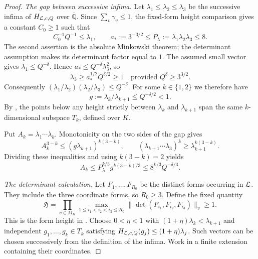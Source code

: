 \documentclass[11pt]{article}
\numberwithin{equation}{section}
\theoremstyle{remark}\newtheorem{remark}[theorem]{Remark}
\newcommand{\Qbar}{\overline{\mathbb Q}}
\begin{document}
\begin{proof}
\emph{The gap between successive infima.}
Let $\lambda_1\le\lambda_2\le\lambda_3$ be the successive infima of
$H_{\mathcal L,c,Q}$ over $\Qbar$. Since $\sum_v\gamma_v\le1$, the fixed-form
height comparison gives a constant $C_0\ge1$ such that
\begin{equation}\label{eq:minima}
 C_0^{-1}Q^{-1}\le\lambda_1,\qquad
 a_*:=3^{-3/2}\le P_\lambda:=\lambda_1\lambda_2\lambda_3\le8.
\end{equation}
The second assertion is the absolute Minkowski theorem; the determinant
assumption makes its determinant factor equal to $1$.
The assumed small vector gives $\lambda_1\le Q^{-\delta}$. Hence
$a_*\le Q^{-\delta}\lambda_3^2$, so
\[
 \lambda_3\ge a_*^{1/2}Q^{\delta/2}\ge1
 \quad\text{provided }Q^\delta\ge3^{3/2}.
\]
Consequently
$(\lambda_1/\lambda_2)(\lambda_2/\lambda_3)\le Q^{-\delta}$.
For some $k\in\{1,2\}$ we therefore have
\begin{equation}\label{eq:minimagap}
 g:=\lambda_k/\lambda_{k+1}\le Q^{-\delta/2}<1.
\end{equation}
By \cite[Lemma~9.1]{EF13}, the points below any height strictly between
$\lambda_k$ and $\lambda_{k+1}$ span the same $k$-dimensional subspace
$T_k$, defined over $K$.

Put $A_k=\lambda_1\cdots\lambda_k$. Monotonicity on the two sides of
the gap gives
\[
 A_k^{3-k}\le(g\lambda_{k+1})^{k(3-k)},\qquad
 (\lambda_{k+1}\cdots\lambda_3)^k
 \ge\lambda_{k+1}^{k(3-k)}.
\]
Dividing these inequalities and using $k(3-k)=2$ yields
\begin{equation}\label{eq:partialminima}
 A_k\le P_\lambda^{k/3}g^{k(3-k)/3}
 \le8^{k/3}Q^{-\delta/3}.
\end{equation}

\emph{The determinant calculation.}
Let $F_1,\ldots,F_{R_0}$ be the distinct forms occurring in $\mathcal L$.
They include the three coordinate forms, so $R_0\ge3$. Define the
fixed quantity
\[
 \mathfrak H=\prod_{v\in M_K}
 \max_{1\le i_1<i_2<i_3\le R_0}
       \|\det(F_{i_1},F_{i_2},F_{i_3})\|_v\ge1.
\]
This is the form height in \cite[Lemma~10.2]{EF13}.
Choose $0<\eta<1$ with $(1+\eta)\lambda_k<\lambda_{k+1}$ and
independent $g_1,\ldots,g_k\in T_k$ satisfying
$H_{\mathcal L,c,Q}(g_j)\le(1+\eta)\lambda_j$. Such vectors can be chosen
successively from the definition of the infima. Work in a finite
extension containing their coordinates.


\end{proof}
\end{document}
